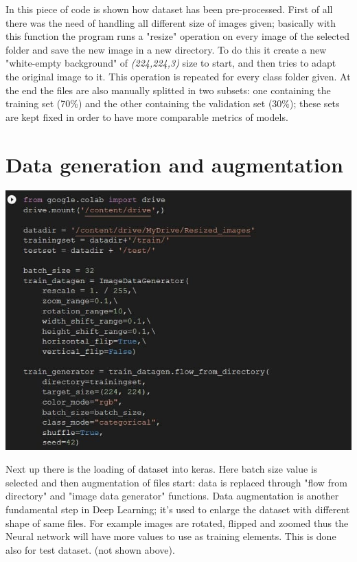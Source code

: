 \documentclass[11pt]{scrartcl}
\begin{document}
{\noindent
\large{ In this piece of code is shown how dataset has been pre-processed. \newline
First of all there was the need of handling all different size of images given; basically with this function the program runs a "resize" operation on every image of the selected folder and save the new image in a new directory. To do this it create a new "white-empty background" of \textit{(224,224,3)} size to start, and then tries to adapt the original image to it. \newline
This operation is repeated for every class folder given. \newline
At the end the files are also manually splitted in two subsets: one containing the training set (70\%) and the other containing the validation set (30\%); these sets are kept fixed in order to have more comparable metrics of models.

\vspace{0.5cm}


\newpage
\section{Data generation and augmentation}

\vspace{0.4cm}
\hspace{+0.2in}\includegraphics[width=1.0\textwidth]{datagenerator.png}
\vspace{0.3cm}

\hspace{-0.2in}\noindent
\large{ Next up there is the loading of dataset into keras.
Here batch size value is selected and then augmentation of files start: data is replaced through "flow from directory" and "image data generator" functions. \newline
Data augmentation is another fundamental step in Deep Learning; it's used to enlarge the dataset with different shape of same files. For example images are rotated, flipped and zoomed thus the Neural network will have more values to use as training elements.
This is done also for test dataset. (not shown above).
}

}}
\end{document}
